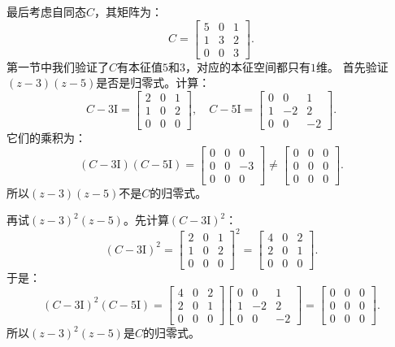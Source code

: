 \documentclass[12pt,UTF8,fontset=none]{ctexbook}
\begin{document}
最后考虑自同态$C$，其矩阵为：
$$
C = \begin{bmatrix} 5 & 0 & 1 \\ 1 & 3 & 2 \\ 0 & 0 & 3 \end{bmatrix}.
$$
第一节中我们验证了$C$有本征值$5$和$3$，对应的本征空间都只有$1$维。
首先验证$(z-3)(z-5)$是否是归零式。计算：
$$
C - 3\mathrm{I} = \begin{bmatrix} 2 & 0 & 1 \\ 1 & 0 & 2 \\ 0 & 0 & 0 \end{bmatrix}, \quad C - 5\mathrm{I} = \begin{bmatrix} 0 & 0 & 1 \\ 1 & -2 & 2 \\ 0 & 0 & -2 \end{bmatrix}.
$$
它们的乘积为：
$$
(C-3\mathrm{I})(C-5\mathrm{I}) = \begin{bmatrix} 0 & 0 & 0 \\ 0 & 0 & -3 \\ 0 & 0 & 0 \end{bmatrix} \neq \begin{bmatrix} 0 & 0 & 0 \\ 0 & 0 & 0 \\ 0 & 0 & 0 \end{bmatrix}.
$$
所以$(z-3)(z-5)$不是$C$的归零式。

再试$(z-3)^2(z-5)$。先计算$(C-3\mathrm{I})^2$：
$$
(C-3\mathrm{I})^2 = \begin{bmatrix} 2 & 0 & 1 \\ 1 & 0 & 2 \\ 0 & 0 & 0 \end{bmatrix}^2 = \begin{bmatrix} 4 & 0 & 2 \\ 2 & 0 & 1 \\ 0 & 0 & 0 \end{bmatrix}.
$$
于是：
$$
(C-3\mathrm{I})^2(C-5\mathrm{I}) = \begin{bmatrix} 4 & 0 & 2 \\ 2 & 0 & 1 \\ 0 & 0 & 0 \end{bmatrix}\begin{bmatrix} 0 & 0 & 1 \\ 1 & -2 & 2 \\ 0 & 0 & -2 \end{bmatrix} = \begin{bmatrix} 0 & 0 & 0 \\ 0 & 0 & 0 \\ 0 & 0 & 0 \end{bmatrix}.
$$
所以$(z-3)^2(z-5)$是$C$的归零式。
\end{document}
